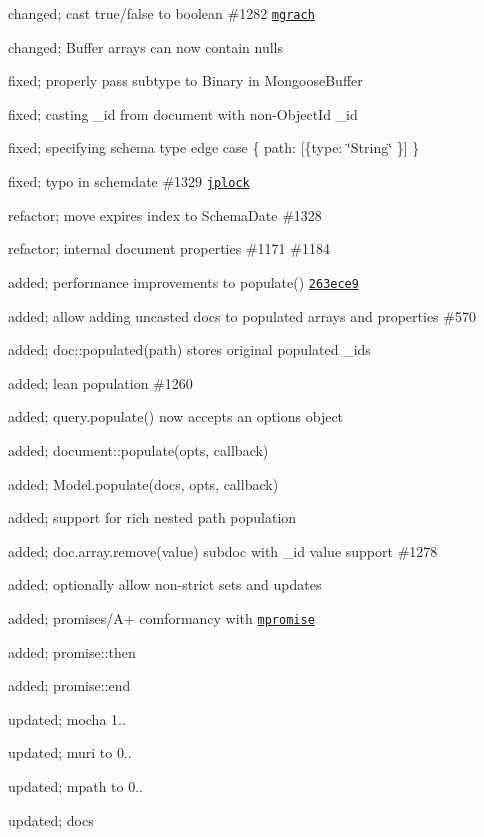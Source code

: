 \begin{DoxyItemize}
\item changed; cast \textquotesingle{}true\textquotesingle{}/\textquotesingle{}false\textquotesingle{} to boolean \#1282 \href{https://github.com/mgrach}{\tt mgrach}
\item changed; Buffer arrays can now contain nulls
\item fixed; properly pass subtype to Binary in Mongoose\+Buffer
\item fixed; casting \+\_\+id from document with non-\/\+Object\+Id \+\_\+id
\item fixed; specifying schema type edge case \{ path\+: \mbox{[}\{type\+: \char`\"{}\+String\char`\"{} \}\mbox{]} \}
\item fixed; typo in schemdate \#1329 \href{https://github.com/jplock}{\tt jplock}
\item refactor; move expires index to Schema\+Date \#1328
\item refactor; internal document properties \#1171 \#1184
\item added; performance improvements to populate() \href{https://github.com/LearnBoost/mongoose/commit/263ece9}{\tt 263ece9}
\item added; allow adding uncasted docs to populated arrays and properties \#570
\item added; doc\+::populated(path) stores original populated \+\_\+ids
\item added; lean population \#1260
\item added; query.\+populate() now accepts an options object
\item added; document\+::populate(opts, callback)
\item added; Model.\+populate(docs, opts, callback)
\item added; support for rich nested path population
\item added; doc.\+array.\+remove(value) subdoc with \+\_\+id value support \#1278
\item added; optionally allow non-\/strict sets and updates
\item added; promises/\+A+ comformancy with \href{https://github.com/aheckmann/mpromise}{\tt mpromise}
\item added; promise\+::then
\item added; promise\+::end
\item updated; mocha 1..
\item updated; muri to 0..
\item updated; mpath to 0..
\item updated; docs
\end{DoxyItemize}

